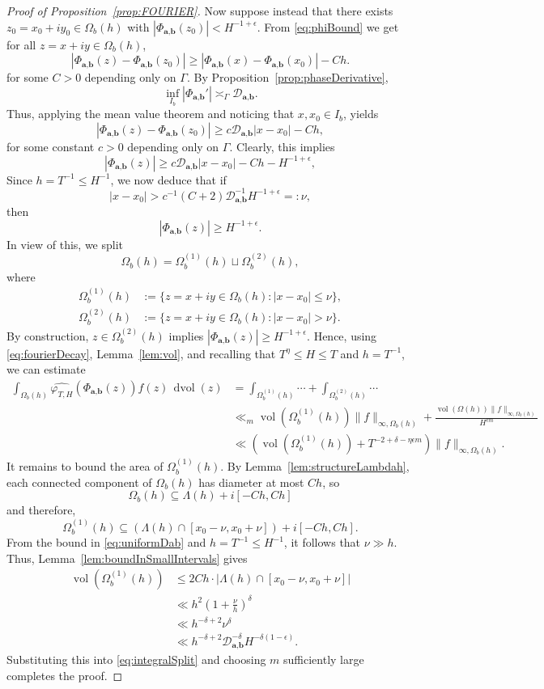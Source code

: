 \documentclass[12pt,letterpaper]{amsart}
\theoremstyle{plain}
\theoremstyle{definition}
\theoremstyle{remark}
\newcommand{\Aa}{\textbf{a}}
\newcommand{\Bb}{\textbf{b}}
\DeclareMathOperator{\dvol}{dvol}
\DeclareMathOperator{\vol}{vol}
\begin{document}
\begin{proof}[Proof of Proposition~\ref{prop:FOURIER}]
Now suppose instead that there exists $z_0 = x_0 + i y_0 \in \Omega_b(h)$ with $|\Phi_{\Aa,\Bb}(z_0)| < H^{-1+\epsilon}$. From \eqref{eq:phiBound} we get for all $z = x + iy \in \Omega_b(h)$,
\[
|\Phi_{\Aa,\Bb}(z) - \Phi_{\Aa,\Bb}(z_0)| \ge |\Phi_{\Aa,\Bb}(x) - \Phi_{\Aa,\Bb}(x_0)| - C h.
\]
for some $C>0$ depending only on $\Gamma$. By Proposition~\ref{prop:phaseDerivative},
\[
\inf_{I_b} |\Phi_{\Aa,\Bb}'| \asymp_\Gamma \mathcal{D}_{\Aa,\Bb}.
\]
Thus, applying the mean value theorem and noticing that $x, x_0 \in I_b$, yields
\[
|\Phi_{\Aa,\Bb}(z) - \Phi_{\Aa,\Bb}(z_0)| \ge c \mathcal{D}_{\Aa,\Bb} |x - x_0| - C h,
\]
for some constant $c > 0$ depending only on $\Gamma$. Clearly, this implies
\[
|\Phi_{\Aa,\Bb}(z)| \ge c \mathcal{D}_{\Aa,\Bb} |x - x_0| - C h - H^{-1+\epsilon},
\]
Since $h = T^{-1} \le H^{-1}$, we now deduce that if
\[
|x - x_0| > c^{-1} (C + 2) \mathcal{D}_{\Aa,\Bb}^{-1} H^{-1+\epsilon} =: \nu,
\]
then
\[
|\Phi_{\Aa,\Bb}(z)| \ge H^{-1+\epsilon}.
\]
In view of this, we split
\[
\Omega_b(h) = \Omega_b^{(1)}(h) \sqcup \Omega_b^{(2)}(h),
\]
where
\begin{align*}
\Omega_b^{(1)}(h) &:= \{ z = x + iy \in \Omega_b(h) : |x - x_0| \le \nu \}, \\
\Omega_b^{(2)}(h) &:= \{ z = x + iy \in \Omega_b(h) : |x - x_0| > \nu \}.
\end{align*}
By construction, $z\in \Omega_b^{(2)}(h) $ implies $|\Phi_{\Aa,\Bb}(z)| \ge H^{-1+\epsilon}$. Hence, using \eqref{eq:fourierDecay}, Lemma~\ref{lem:vol}, and recalling that $T^\eta \le H \le T$ and $h= T^{-1}$, we can estimate
\begin{align}
\int_{\Omega_b(h)} \widehat{\varphi_{T,H}}(\Phi_{\Aa,\Bb}(z)) f(z)\, \dvol(z)
&= \int_{\Omega_b^{(1)}(h)} \cdots + \int_{\Omega_b^{(2)}(h)} \cdots \\
&\ll_m \vol(\Omega_b^{(1)}(h)) \|f\|_{\infty,\Omega_b(h)}
+ \frac{\vol(\Omega(h)) \|f\|_{\infty,\Omega_b(h)}}{H^{\epsilon m}} \\
&\ll \left( \vol(\Omega_b^{(1)}(h)) + T^{-2+\delta - \eta \epsilon m} \right) \|f\|_{\infty,\Omega_b(h)}. \label{eq:integralSplit}
\end{align}
It remains to bound the area of $\Omega_b^{(1)}(h)$. By Lemma~\ref{lem:structureLambdah}, each connected component of $\Omega_b(h)$ has diameter at most $C h$, so
\[
\Omega_b(h) \subseteq \Lambda(h) + i[-Ch, Ch]
\]
and therefore,
\[
\Omega_b^{(1)}(h) \subseteq (\Lambda(h) \cap [x_0 - \nu, x_0 + \nu]) + i[-Ch, Ch].
\]
From the bound in \eqref{eq:uniformDab} and $h = T^{-1} \le H^{-1}$, it follows that $\nu \gg h$. Thus, Lemma~\ref{lem:boundInSmallIntervals} gives
\begin{align*}
\vol(\Omega_b^{(1)}(h)) 
&\le 2Ch \cdot |\Lambda(h) \cap [x_0 - \nu, x_0 + \nu]| \\
&\ll h^2 \left(1 + \frac{\nu}{h}\right)^\delta \\
&\ll h^{-\delta + 2} \nu^\delta \\
&\ll h^{-\delta + 2} \mathcal{D}_{\Aa,\Bb}^{-\delta} H^{-\delta(1 - \epsilon)}.
\end{align*}
Substituting this into \eqref{eq:integralSplit} and choosing $m$ sufficiently large completes the proof.
\end{proof}
\end{document}
